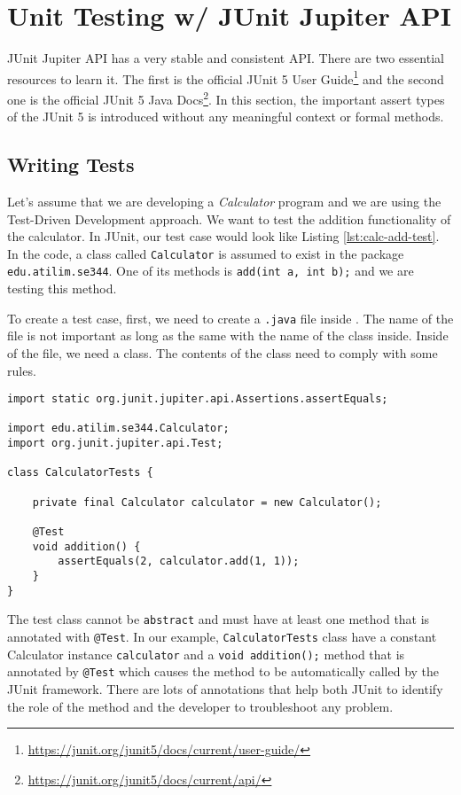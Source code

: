 \chapter{Unit Testing w/ JUnit Jupiter API}
JUnit Jupiter API has a very stable and consistent API. There are two essential resources to learn it. The first is the official JUnit 5 User Guide\footnote{\url{https://junit.org/junit5/docs/current/user-guide/}} and the second one is the official JUnit 5 Java Docs\footnote{\url{https://junit.org/junit5/docs/current/api/}}. In this section, the important assert types of the JUnit 5 is introduced without any meaningful context or formal methods.

\section{Writing Tests}
Let's assume that we are developing a \emph{Calculator} program and we are using the Test-Driven Development approach. We want to test the addition functionality of the calculator. In JUnit, our test case would look like Listing \ref{lst:calc-add-test}. In the code, a class called \verb|Calculator| is assumed to exist in the package \lstinline|edu.atilim.se344|. One of its methods is \lstinline!add(int a, int b);! and we are testing this method.

To create a test case, first, we need to create a \lstinline[language={}]|.java| file inside . The name of the file is not important as long as the same with the name of the class inside. Inside of the file, we need a class. The contents of the class need to comply with some rules.

\begin{lstlisting}[caption={A test case for testing the addition functionality of the Calculator class.},label=lst:calc-add-test]
import static org.junit.jupiter.api.Assertions.assertEquals;

import edu.atilim.se344.Calculator;
import org.junit.jupiter.api.Test;

class CalculatorTests {

    private final Calculator calculator = new Calculator();

    @Test
    void addition() {
        assertEquals(2, calculator.add(1, 1));
    }
}
\end{lstlisting}

The test class cannot be \lstinline{abstract} and must have at least one method that is annotated with \lstinline!@Test!. In our example, \lstinline|CalculatorTests| class have a constant Calculator instance \lstinline|calculator| and a \lstinline!void addition();! method that is annotated by \lstinline!@Test! which causes the method to be automatically called by the JUnit framework. There are lots of annotations that help both JUnit to identify the role of the method and the developer to troubleshoot any problem.

